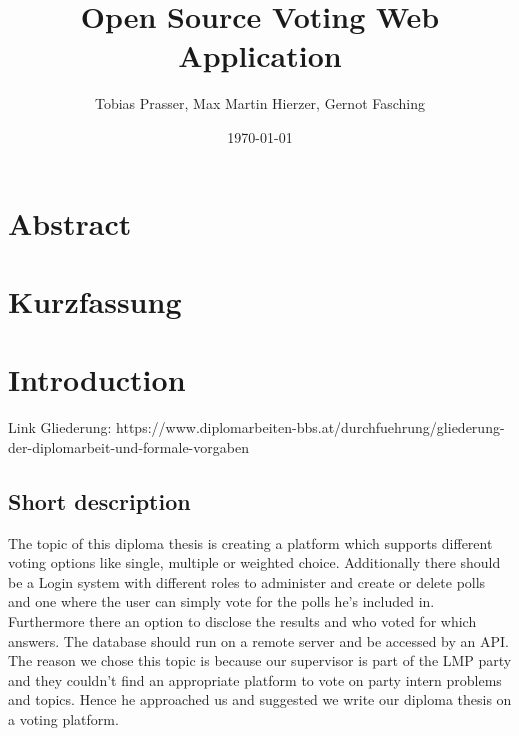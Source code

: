 \documentclass[a4paper,12pt]{report}
\begin{document}
\title{Open Source Voting Web Application}
\author{Tobias Prasser, Max Martin Hierzer, Gernot Fasching}
\date{\today}
\maketitle

\chapter*{Abstract}
\newpage

\chapter*{Kurzfassung}
\newpage

\tableofcontents
\newpage

\chapter{Introduction}
Link Gliederung: https://www.diplomarbeiten-bbs.at/durchfuehrung/gliederung-der-diplomarbeit-und-formale-vorgaben
\section{Short description}

The topic of this diploma thesis is creating a platform which supports different voting options like single, multiple or weighted choice. Additionally there should be a Login system with different roles to administer and create or delete polls and one where the user can simply vote for the polls he's included in. Furthermore there an option to disclose the results and who voted for which answers. The database should run on a remote server and be accessed by an API. \\
The reason we chose this topic is because our supervisor is part of the LMP party and they couldn't find an appropriate platform to vote on party intern problems and topics. Hence he approached us and suggested we write our diploma thesis on a voting platform.
\end{document}
